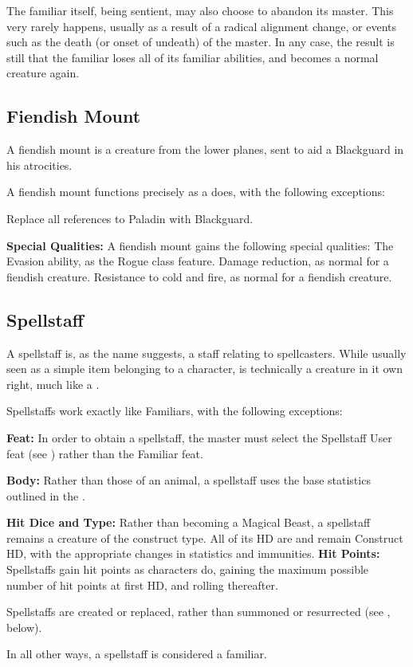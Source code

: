 The familiar itself, being sentient, may also choose to abandon its master.
This very rarely happens, usually as a result of a radical alignment change, or events such as the death (or onset of undeath) of the master.
In any case, the result is still that the familiar loses all of its familiar abilities, and becomes a normal creature again.
\subsection{Fiendish Mount}
\label{sec:FiendishMount}
A fiendish mount is a creature from the lower planes, sent to aid a Blackguard in his atrocities. 

A fiendish mount functions precisely as a  does, with the following exceptions:
\begin{list}{}{\leftmargin=1em}
 \item Replace all references to Paladin with Blackguard.
 \item \textbf{Special Qualities:} A fiendish mount gains the following special qualities:
 \subitem The Evasion ability, as the Rogue class feature.
 \subitem Damage reduction, as normal for a fiendish creature.
 \subitem Resistance to cold and fire, as normal for a fiendish creature.
\end{list}

\subsection{Spellstaff}
\label{sec:SpellStaff}
A spellstaff is, as the name suggests, a staff relating to spellcasters.
While usually seen as a simple item belonging to a character, is technically a creature in it own right, much like a .

Spellstaffs work exactly like Familiars, with the following exceptions:
\begin{list}{}{\leftmargin=1em}
 \item \textbf{Feat:} In order to obtain a spellstaff, the master must select the Spellstaff User feat (see ) rather than the Familiar feat.
 \item \textbf{Body:} Rather than those of an animal, a spellstaff uses the base statistics outlined in the .
 \item \textbf{Hit Dice and Type:} Rather than becoming a Magical Beast, a spellstaff remains a creature of the construct type. 
 All of its HD are and remain Construct HD, with the appropriate changes in statistics and immunities.
 \subitem \textbf{Hit Points:} Spellstaffs gain hit points as characters do, gaining the maximum possible number of hit points at first HD, 
 and rolling thereafter.
 \item Spellstaffs are created or replaced, rather than summoned or resurrected (see , below).
\end{list}
In all other ways, a spellstaff is considered a familiar.

